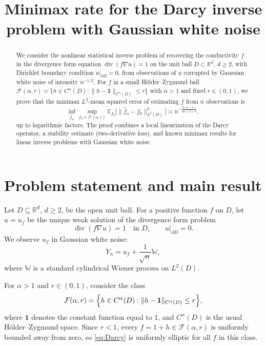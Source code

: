 \documentclass[11pt]{article}
\title{Minimax rate for the Darcy inverse problem with Gaussian white noise}
\author{}
\date{}
\theoremstyle{definition}
\theoremstyle{remark}
\newcommand{\R}{\mathbb{R}}
\newcommand{\E}{\mathbb{E}}
\newcommand{\F}{\mathcal{F}}
\begin{document}
\maketitle

\begin{abstract}
We consider the nonlinear statistical inverse problem of recovering the conductivity \(f\) in the divergence form equation
\(\operatorname{div}(f\nabla u)=1\) on the unit ball \(D\subset \R^d\), \(d\ge 2\), with Dirichlet boundary condition \(u|_{\partial D}=0\), from observations of \(u\) corrupted by Gaussian white noise of intensity \(n^{-1/2}\).
For \(f\) in a small Hölder--Zygmund ball \(\F(\alpha,r)=\{h\in C^\alpha(D): \|h-\mathbf 1\|_{C^\alpha(D)}\le r\}\) with \(\alpha>1\) and fixed \(r\in(0,1)\), we prove that the minimax \(L^2\)-mean squared error of estimating \(f\) from \(n\) observations is
\[
\inf_{\hat f_n}\sup_{f_0\in \F(\alpha,r)}
\E_{f_0}\bigl[\|\hat f_n-f_0\|_{L^2(D)}^2\bigr]
\asymp n^{-\frac{2(\alpha-1)}{2\alpha+2+d}},
\]
up to logarithmic factors. The proof combines a local linearization of the Darcy operator, a stability estimate (two-derivative loss), and known minimax results for linear inverse problems with Gaussian white noise.
\end{abstract}

\section{Problem statement and main result}

Let \(D\subseteq \R^d\), \(d\ge 2\), be the open unit ball. For a positive function \(f\) on \(D\), let \(u=u_f\) be the unique weak solution of the divergence form problem
\begin{equation}\label{eq:Darcy}
\operatorname{div}(f\nabla u)=1\quad\text{in }D,\qquad u|_{\partial D}=0.
\end{equation}
We observe \(u_f\) in Gaussian white noise:
\begin{equation}\label{eq:obs}
Y_n=u_f+\frac{1}{\sqrt n}\mathbb W,
\end{equation}
where \(\mathbb W\) is a standard cylindrical Wiener process on \(L^2(D)\).

For \(\alpha>1\) and \(r\in(0,1)\), consider the class
\begin{equation}\label{eq:class}
\F(\alpha,r)=\Bigl\{h\in C^\alpha(D): \|h-\mathbf 1\|_{C^\alpha(D)}\le r\Bigr\},
\end{equation}
where \(\mathbf 1\) denotes the constant function equal to \(1\), and \(C^\alpha(D)\) is the usual Hölder--Zygmund space. Since \(r<1\), every \(f=1+h\in\F(\alpha,r)\) is uniformly bounded away from zero, so \eqref{eq:Darcy} is uniformly elliptic for all \(f\) in this class.
\end{document}
